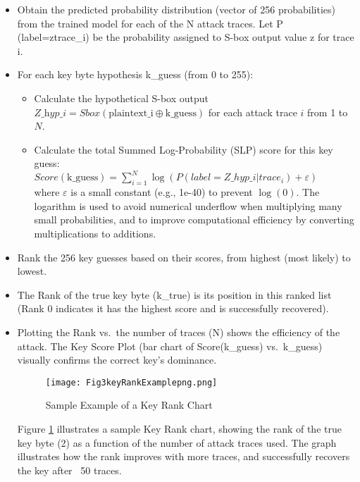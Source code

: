 \documentclass[runningheads]{llncs}
\begin{document}
\begin{itemize}
    \item Obtain the predicted probability distribution (vector of 256 probabilities) from the trained model for each of the N attack traces. Let P (label=z\textbar trace\_i) be the probability assigned to S-box output value z for trace i.

     \item For each key byte hypothesis k\_guess (from 0 to 255):
        \begin{itemize}
            \item Calculate the hypothetical S-box output \\$\textit{Z\_hyp\_i} = \textit{Sbox}(\textit{$\text{plaintext\_i}$} \oplus \textit {$\text{k\_guess}$})$ for each attack trace $i$ from 1 to $N$.
            \item Calculate the total Summed Log-Probability (SLP) score for this key guess:\\
            $\textit{Score} (\text{k\_guess})=\sum_{i=1}^{N} \log (P (\textit{label}=Z\_hyp\_i | \textit{trace}_i) + \varepsilon)$ \\
            where $\varepsilon$ is a small constant (e.g., 1e-40) to prevent $\log(0)$. The logarithm is used to avoid numerical underflow when multiplying many small probabilities, and to improve computational efficiency by converting multiplications to additions.
        \end{itemize}
    \item Rank the 256 key guesses based on their scores, from highest (most likely) to lowest.

    \item The Rank of the true key byte (k\_true) is its position in this ranked list (Rank 0 indicates it has the highest score and is successfully recovered).

    \item Plotting the Rank vs.\ the number of traces (N) shows the efficiency of the attack. The Key Score Plot (bar chart of Score(k\_guess) vs.\ k\_guess) visually confirms the correct key's dominance.
    
\begin{figure}[htbp]
    \centering
    \texttt{[image: Fig3keyRankExamplepng.png]}
    \caption{Sample Example of a Key Rank Chart}
    \label{fig:key_rank_example}
\end{figure}
Figure \ref{fig:key_rank_example} illustrates a sample Key Rank chart, showing the rank of the true key byte (2) as a function of the number of attack traces used. The graph illustrates how the rank improves with more traces, and successfully recovers the key after ~50 traces.
\end{itemize}
\end{document}
